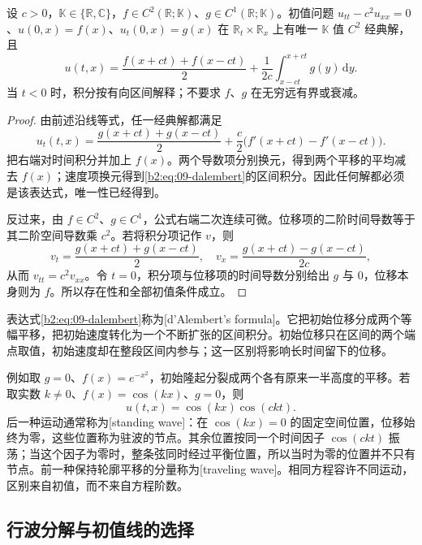 \begin{theorem}[d'Alembert]\label{b2:thm:09-dalembert}
设 \(c>0\)，\(\mathbb K\in\{\mathbb R,\mathbb C\}\)，\(f\in C^2(\mathbb R;\mathbb K)\)、\(g\in C^1(\mathbb R;\mathbb K)\)。初值问题 \(u_{tt}-c^2u_{xx}=0\)、\(u(0,x)=f(x)\)、\(u_t(0,x)=g(x)\) 在 \(\mathbb R_t\times\mathbb R_x\) 上有唯一 \(\mathbb K\) 值 \(C^2\) 经典解，且
\begin{equation}\label{b2:eq:09-dalembert}
 u(t,x)=\dfrac{f(x+ct)+f(x-ct)}2
 +\dfrac1{2c}\int_{x-ct}^{x+ct}g(y)\,\mathrm{d}y.
\end{equation}
当 \(t<0\) 时，积分按有向区间解释；不要求 \(f\)、\(g\) 在无穷远有界或衰减。
\end{theorem}
\begin{proof}
由前述沿线等式，任一经典解都满足
\[
 u_t(t,x)=\dfrac{g(x+ct)+g(x-ct)}2
 +\dfrac c2\bigl(f'(x+ct)-f'(x-ct)\bigr).
\]
把右端对时间积分并加上 \(f(x)\)。两个导数项分别换元，得到两个平移的平均减去 \(f(x)\)；速度项换元得到\eqref{b2:eq:09-dalembert}的区间积分。因此任何解都必须是该表达式，唯一性已经得到。

反过来，由 \(f\in C^2\)、\(g\in C^1\)，公式右端二次连续可微。位移项的二阶时间导数等于其二阶空间导数乘 \(c^2\)。若将积分项记作 \(v\)，则
\[
 v_t=\dfrac{g(x+ct)+g(x-ct)}2,\quad
 v_x=\dfrac{g(x+ct)-g(x-ct)}{2c},
\]
从而 \(v_{tt}=c^2v_{xx}\)。令 \(t=0\)，积分项与位移项的时间导数分别给出 \(g\) 与 \(0\)，位移本身则为 \(f\)。所以存在性和全部初值条件成立。
\end{proof}

表达式\eqref{b2:eq:09-dalembert}称为[d'Alembert's formula]。它把初始位移分成两个等幅平移，把初始速度转化为一个不断扩张的区间积分。初始位移只在区间的两个端点取值，初始速度却在整段区间内参与；这一区别将影响长时间留下的位移。

\ProseParagraphBreak

例如取 \(g=0\)、\(f(x)=e^{-x^2}\)，初始隆起分裂成两个各有原来一半高度的平移。若取实数 \(k\ne0\)、\(f(x)=\cos(kx)\)、\(g=0\)，则
\[
 u(t,x)=\cos(kx)\cos(ckt).
\]
后一种运动通常称为[standing wave]：在 \(\cos(kx)=0\) 的固定空间位置，位移始终为零，这些位置称为驻波的节点。其余位置按同一个时间因子 \(\cos(ckt)\) 振荡；当这个因子为零时，整条弦同时经过平衡位置，所以当时为零的位置并不只有节点。前一种保持轮廓平移的分量称为[traveling wave]。相同方程容许不同运动，区别来自初值，而不来自方程阶数。

\subsection{行波分解与初值线的选择}
\label{b2:subsec:090103}

